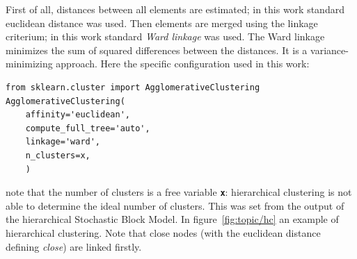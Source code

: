 First of all, distances between all elements are estimated; in this work standard euclidean distance was used. Then elements are merged using the linkage criterium; in this work standard \textit{Ward linkage} was used. The Ward linkage minimizes the sum of squared differences between the distances. It is a variance-minimizing approach. Here the specific configuration used in this work:
\begin{lstlisting}[style=mypython]
from sklearn.cluster import AgglomerativeClustering
AgglomerativeClustering(
    affinity='euclidean',
    compute_full_tree='auto',
    linkage='ward',
    n_clusters=x,
    )
\end{lstlisting}
note that the number of clusters is a free variable \texttt{\textbf{x}}: hierarchical clustering is not able to determine the ideal number of clusters. This was set from the output of the hierarchical Stochastic Block Model.
In figure~\ref{fig:topic/hc} an example of hierarchical clustering. Note that close nodes (with the euclidean distance defining \textit{close}) are linked firstly.
